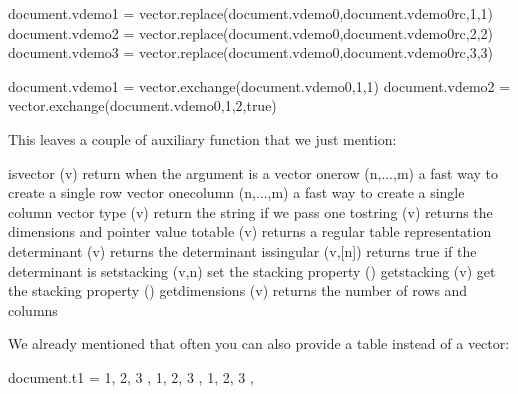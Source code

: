 \startbuffer
\startluacode
document.vdemo1 = vector.replace(document.vdemo0,document.vdemo0rc,1,1)
document.vdemo2 = vector.replace(document.vdemo0,document.vdemo0rc,2,2)
document.vdemo3 = vector.replace(document.vdemo0,document.vdemo0rc,3,3)
\stopluacode
\stopbuffer

\typebuffer[option=TEX] \getbuffer

\startlinecorrection
{} {}
    {} {}
    {} {}
\stopcombination
\stoplinecorrection

\startbuffer
\startluacode
document.vdemo1 = vector.exchange(document.vdemo0,1,1)
document.vdemo2 = vector.exchange(document.vdemo0,1,2,true)
\stopluacode
\stopbuffer

\typebuffer[option=TEX] \getbuffer

\startlinecorrection
{} {}
    {} {}
\stopcombination
\stoplinecorrection

This leaves a couple of auxiliary function that we just mention:

\starttabulate[|Tl|Tl|l|]
\NC isvector      \NC (v)       \NC return  when the argument is a vector \NC \NR
\NC onerow        \NC (n,...,m) \NC a fast way to create a single row vector \NC \NR
\NC onecolumn     \NC (n,...,m) \NC a fast way to create a single column vector \NC \NR
\NC type          \NC (v)       \NC return the string  if we pass one \NC \NR
\NC tostring      \NC (v)       \NC returns the dimensions and pointer value \NC \NR
\NC totable       \NC (v)       \NC returns a regular table representation \NC \NR
\NC determinant   \NC (v)       \NC returns the determinant \NC \NR
\NC issingular    \NC (v,[n])   \NC returns true if the determinant is  \NC \NR
\NC setstacking   \NC (v,n)     \NC set the stacking property (\METAPOST) \NC \NR
\NC getstacking   \NC (v)       \NC get the stacking property (\METAPOST) \NC \NR
\NC getdimensions \NC (v)       \NC returns the number of rows and columns \NC \NR
\stoptabulate

We already mentioned that often you can also provide a table instead
of a vector:

\startbuffer
\startluacode
document.t1 = {
    { 1, 2, 3 },
    { 1, 2, 3 },
    { 1, 2, 3 },
}

